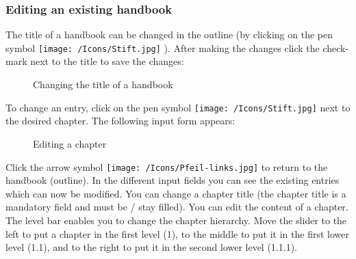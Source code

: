 \subsubsection{Editing an existing handbook}

The title of a handbook can be changed in the outline (by clicking on the pen symbol \texttt{[image: /Icons/Stift.jpg]} ). After making the changes click the check-mark next to the title to save the changes:

\begin{figure}[H]
\caption{Changing the title of a handbook}
\end{figure}

To change an entry, click on the pen symbol \texttt{[image: /Icons/Stift.jpg]} next to the desired chapter. The following input form appears:

\begin{figure}[H]
\caption{Editing a chapter}
\end{figure}

Click the arrow symbol \texttt{[image: /Icons/Pfeil-links.jpg]}  to return to the handbook (outline). In the different input fields you can see the existing entries which can now be modified. You can change a chapter title  (the chapter title is a mandatory field and must be / stay filled). You can edit the content  of a chapter. The level bar  enables you to change the chapter hierarchy. Move the slider to the left to put a chapter in the first level (1), to the middle to put it in the first lower level (1.1), and to the right to put it in the second lower level (1.1.1). \\


